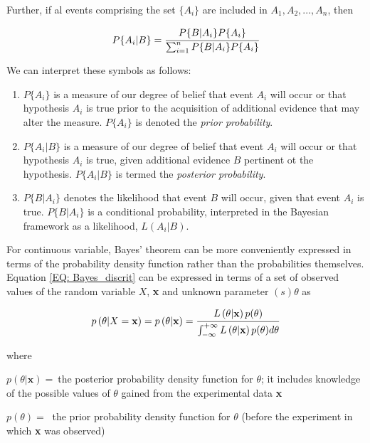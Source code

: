 \documentclass[a4paper,fleqn]{cas-dc}
\begin{document}
Further, if al events comprising the set $\{A_i\}$ are included in $A_1,A_2,...,A_n$, then

{\footnotesize
\begin{equation} \label{EQ: Bayes_discrit}
	P\{A_i|B\} = \cfrac{P\{B|A_i\}P\{A_i\}}{ \sum_{i=1}^{n} P\{B|A_i\} P\{A_i\} }
\end{equation} }

We can interpret these symbols as follows:

\begin{enumerate}
	\item $P\{A_i\}$ is a measure of our degree of belief that event $A_i$ will occur or that hypothesis $A_i$ is true prior to the acquisition of additional evidence that may alter the measure. $P\{A_i\}$ is denoted the \textit{prior probability}.
	\item $P\{A_i|B\}$ is a measure of our degree of belief that event $A_i$ will occur or that hypothesis $A_i$ is true, given additional evidence $B$ pertinent ot the hypothesis. $P\{A_i|B\}$ is termed the \textit{posterior probability}.
	\item $P\{B|A_i\}$ denotes the likelihood that event $B$ will occur, given that event $A_i$ is true. $P\{B|A_i\}$ is a conditional probability, interpreted in the Bayesian framework as a likelihood, $L(A_i|B)$.
\end{enumerate}

For continuous variable, Bayes' theorem can be more conveniently expressed in terms of the probability density function rather than the probabilities themselves. Equation \ref{EQ: Bayes_discrit} can be expressed in terms of a set of observed values of the random variable $X$, \textbf{x} and unknown parameter $(s)\theta$ as

{\footnotesize
\begin{equation} \label{EQ: Bayes_continous}
	p\left( \theta|X=\textbf{x} \right) = p\left( \theta|\textbf{x} \right) = \cfrac{L\left( \theta|\textbf{x} \right) p(\theta)}{\int_{-\infty}^{+\infty} L\left( \theta|\textbf{x} \right) p(\theta) d\theta}
\end{equation} }

where

$p(\theta|\textbf{x}) = ~$the posterior probability density function for $\theta$; it includes knowledge of the possible values of $\theta$ gained from the experimental data \textbf{x}

$p(\theta) = ~$ the prior probability density function for $\theta$ (before the experiment in which \textbf{x} was observed)
\end{document}
